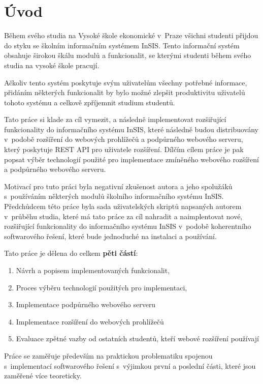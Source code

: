 \chapter*{Úvod}

Během svého studia na Vysoké škole ekonomické v~Praze všichni studenti přijdou do styku se školním informačním systémem InSIS. Tento informační systém obsahuje širokou škálu modulů a funkcionalit, se kterými studenti během svého studia na vysoké škole pracují.

Ačkoliv tento systém poskytuje svým uživatelům všechny potřebné informace, přidáním některých funkcionalit by bylo možné zlepšit produktivitu uživatelů tohoto systému a celkově zpříjemnit studium studentů.

Tato práce si klade za cíl vymezit, a následně implementovat rozšiřující funkcionality do informačního systému InSIS, které následně budou distribuovány v~podobě rozšíření do webových prohlížečů a podpůrného webového serveru, který poskytuje REST API pro uživatele rozšíření. Dílčím cílem práce je pak popsat výběr technologií použité pro implementace zmíněného webového rozšíření a podpůrného webového serveru.

Motivací pro tuto práci byla negativní zkušenost autora a jeho spolužáků s~používáním některých modulů školního informačního systému InSIS. 
Předchůdcem této práce byla sada uživatelských skriptů napsaných autorem v~průběhu studia, které má tato práce za cíl nahradit a naimplentovat nové, rozšiřující funkcionality do informačního systému InSIS v~podobě koherentního softwarového řešení, které bude jednoduché na instalaci a používání.

Tato práce je dělena do celkem \textbf{pěti částí}: 

\begin{enumerate}
    \item Návrh a popisem implementovaných funkcionalit,
    \item Proces výběru technologií použitých pro implementaci,
    \item Implementace podpůrného webového serveru
    \item Implementace rozšíření do webových prohlížečů
    \item Evaluace zpětné vazby od ostatních studentů, kteří webové rozšíření používají
\end{enumerate}

Práce se zaměřuje především na praktickou problematiku spojenou s~implementací softwarového řešení s~výjimkou první a poslední části, které jsou zaměřené více teoreticky.


